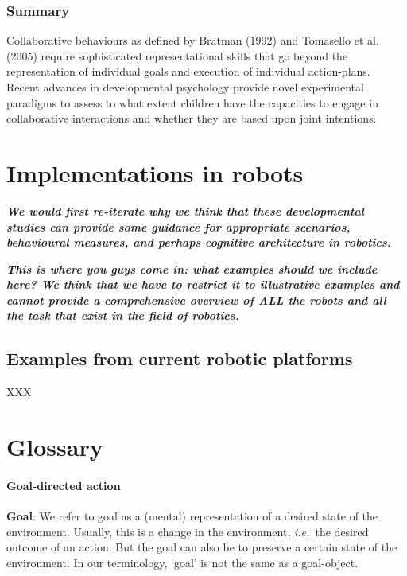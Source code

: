 \documentclass{article}
\newcommand{\ie}{{\textit{i.e.~}}}
\begin{document}
\subsubsection{Summary}

Collaborative behaviours as defined by Bratman (1992) and Tomasello et al.
(2005) require sophisticated representational skills that go beyond the
representation of individual goals and execution of individual action-plans.
Recent advances in developmental psychology provide novel experimental
paradigms to assess to what extent children have the capacities to engage in
collaborative interactions and whether they are based upon joint intentions. 

\section{Implementations in robots}

{\bfseries\itshape We would first re-iterate why we think that these
developmental studies can provide some guidance for appropriate scenarios,
behavioural measures, and perhaps cognitive architecture in robotics.}

{\bfseries\itshape This is where you guys come in: what examples should we
include here? We think that we have to restrict it to illustrative examples and
cannot provide a comprehensive overview of ALL the robots and all the task that
exist in the field of robotics.}

\subsection{Examples from current robotic platforms}

XXX

\section{Glossary}

\paragraph{Goal-directed action}

\textbf{Goal}: We refer to goal as a (mental) representation of a desired state
of the environment. Usually, this is a change in the environment, \ie the
desired outcome of an action. But the goal can also be to preserve a certain
state of the environment. In our terminology, `goal' is not the same as a
goal-object. 
\end{document}
